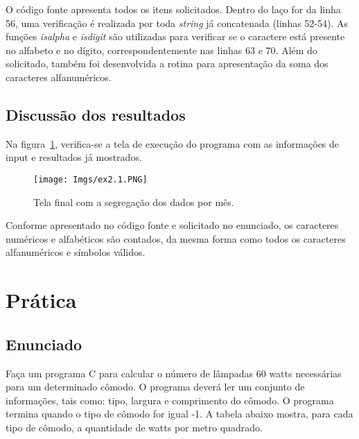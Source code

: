 \documentclass[
	12pt,				%
	openright,			%
	oneside,			%
	a4paper,			%
	chapter=TITLE,		%
	section=TITLE,		%
	english,			%
	french,				%
	spanish,			%
	brazil				%
	]{abntex2}
\begin{document}
		
	
	O código fonte apresenta todos os itens solicitados. Dentro do laço for da linha 56, uma verificação é realizada por toda \emph{string} já concatenada (linhas 52-54). As funções \emph{isalpha} e \emph{isdigit} são utilizadas para verificar se o caractere está presente no alfabeto e no dígito, correspondentemente nas linhas 63 e 70. Além do solicitado, também foi desenvolvida a rotina para apresentação da soma dos caracteres alfanuméricos.

\section[DISCUSSÃO DOS RESULTADOS]{Discussão dos resultados}

	Na figura~\ref{fig:ex2.1}, verifica-se a tela de execução do programa com as informações de input e resultados já mostrados.

	\begin{figure}[ht]
		\begin{center}
			\caption{Tela final com a segregação dos dados por mês.} 
			\texttt{[image: Imgs/ex2.1.PNG]}
			\label{fig:ex2.1}
		\end{center}
	\end{figure}

	Conforme apresentado no código fonte e solicitado no enunciado, os caracteres numéricos e alfabéticos são contados, da mesma forma como todos os caracteres alfanuméricos e símbolos válidos.
\chapter[\bfseries{PRÁTICA 3}]{\bfseries{Prática}}

\section[ENUNCIADO]{Enunciado}

	Faça um programa C para calcular o número de lâmpadas 60 watts necessárias para um determinado cômodo. O programa deverá ler um conjunto de informações, tais como: tipo, largura e comprimento do cômodo. O programa termina quando o tipo de cômodo for igual -1. A tabela abaixo mostra, para cada tipo de cômodo, a quantidade de watts por metro quadrado.
\end{document}
